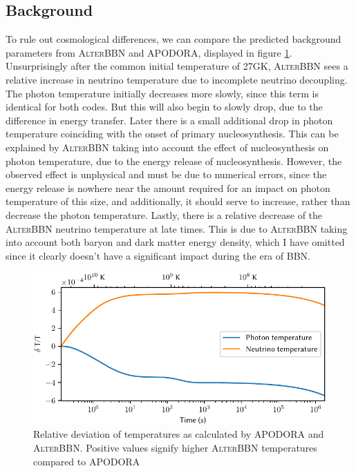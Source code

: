 \subsection{Background}
\label{sec:AlterBackground}
To rule out cosmological differences, we can compare the predicted background parameters from \textsc{AlterBBN} and APODORA, displayed in figure \ref{fig:comparetemp}. Unsurprisingly after the common initial temperature of 27GK, \textsc{AlterBBN} sees a relative increase in neutrino temperature due to incomplete neutrino decoupling. The photon temperature initially decreases more slowly, since this term is identical for both codes. But this will also begin to slowly drop, due to the difference in energy transfer. Later there is a small additional drop in photon temperature coinciding with the onset of primary nucleosynthesis. This can be explained by \textsc{AlterBBN} taking into account the effect of nucleosynthesis on photon temperature, due to the energy release of nucleosynthesis. However, the observed effect is unphysical and must be due to numerical errors, since the energy release is nowhere near the amount required for an impact on photon temperature of this size, and additionally, it should serve to increase, rather than decrease the photon temperature. Lastly, there is a relative decrease of the \textsc{AlterBBN} neutrino temperature at late times. This is due to \textsc{AlterBBN} taking into account both baryon and dark matter energy density, which I have omitted since it clearly doesn't have a significant impact during the era of BBN.
\begin{figure}[ht]
    \includegraphics[width=5.1in]{figures/comparetemp.pdf}
    \caption{Relative deviation of temperatures as calculated by APODORA and \textsc{AlterBBN}. Positive values signify higher \textsc{AlterBBN} temperatures compared to APODORA}
    \label{fig:comparetemp}
\end{figure}

